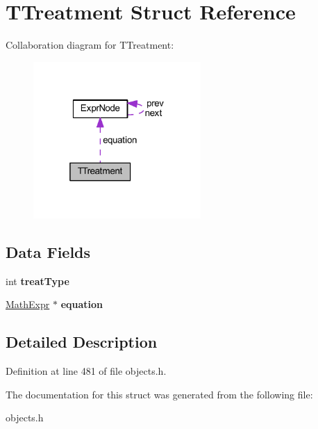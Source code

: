 \hypertarget{struct_t_treatment}{}\section{T\+Treatment Struct Reference}
\label{struct_t_treatment}


Collaboration diagram for T\+Treatment\+:
\nopagebreak
\begin{figure}[H]
\begin{center}
\leavevmode
\includegraphics[width=181pt]{d9/dd4/struct_t_treatment__coll__graph}
\end{center}
\end{figure}
\subsection*{Data Fields}
\begin{DoxyCompactItemize}
\item 
\mbox{\label{struct_t_treatment_a70ea332aa1b21ef71143fe287fcad9db}} 
int {\bfseries treat\+Type}
\item 
\mbox{\label{struct_t_treatment_a1b2b62ace95b47c4e2f91ea531cd5ef2}} 
\hyperlink{struct_expr_node}{Math\+Expr} $\ast$ {\bfseries equation}
\end{DoxyCompactItemize}


\subsection{Detailed Description}


Definition at line 481 of file objects.\+h.



The documentation for this struct was generated from the following file\+:\begin{DoxyCompactItemize}
\item 
objects.\+h\end{DoxyCompactItemize}
